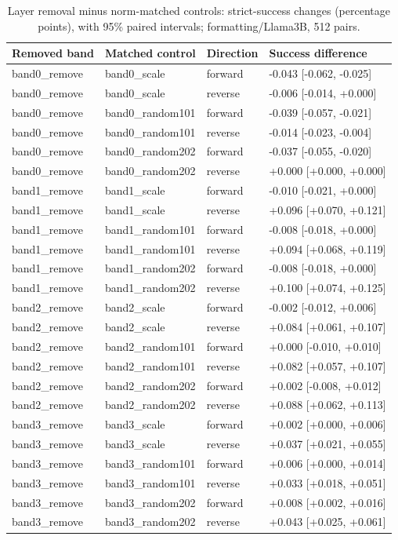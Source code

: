 \begin{table}[t]
\centering\small
\begin{tabular}{llll}
\toprule
Removed band & Matched control & Direction & Success difference \\
\midrule
band0\_remove & band0\_scale & forward & -0.043 [-0.062, -0.025] \\
band0\_remove & band0\_scale & reverse & -0.006 [-0.014, +0.000] \\
band0\_remove & band0\_random101 & forward & -0.039 [-0.057, -0.021] \\
band0\_remove & band0\_random101 & reverse & -0.014 [-0.023, -0.004] \\
band0\_remove & band0\_random202 & forward & -0.037 [-0.055, -0.020] \\
band0\_remove & band0\_random202 & reverse & +0.000 [+0.000, +0.000] \\
band1\_remove & band1\_scale & forward & -0.010 [-0.021, +0.000] \\
band1\_remove & band1\_scale & reverse & +0.096 [+0.070, +0.121] \\
band1\_remove & band1\_random101 & forward & -0.008 [-0.018, +0.000] \\
band1\_remove & band1\_random101 & reverse & +0.094 [+0.068, +0.119] \\
band1\_remove & band1\_random202 & forward & -0.008 [-0.018, +0.000] \\
band1\_remove & band1\_random202 & reverse & +0.100 [+0.074, +0.125] \\
band2\_remove & band2\_scale & forward & -0.002 [-0.012, +0.006] \\
band2\_remove & band2\_scale & reverse & +0.084 [+0.061, +0.107] \\
band2\_remove & band2\_random101 & forward & +0.000 [-0.010, +0.010] \\
band2\_remove & band2\_random101 & reverse & +0.082 [+0.057, +0.107] \\
band2\_remove & band2\_random202 & forward & +0.002 [-0.008, +0.012] \\
band2\_remove & band2\_random202 & reverse & +0.088 [+0.062, +0.113] \\
band3\_remove & band3\_scale & forward & +0.002 [+0.000, +0.006] \\
band3\_remove & band3\_scale & reverse & +0.037 [+0.021, +0.055] \\
band3\_remove & band3\_random101 & forward & +0.006 [+0.000, +0.014] \\
band3\_remove & band3\_random101 & reverse & +0.033 [+0.018, +0.051] \\
band3\_remove & band3\_random202 & forward & +0.008 [+0.002, +0.016] \\
band3\_remove & band3\_random202 & reverse & +0.043 [+0.025, +0.061] \\
\bottomrule
\end{tabular}
\caption{Layer removal minus norm-matched controls: strict-success changes (percentage points), with 95\% paired intervals; formatting/Llama3B, 512 pairs.}
\label{tab:sprint-layer-controls}
\end{table}
